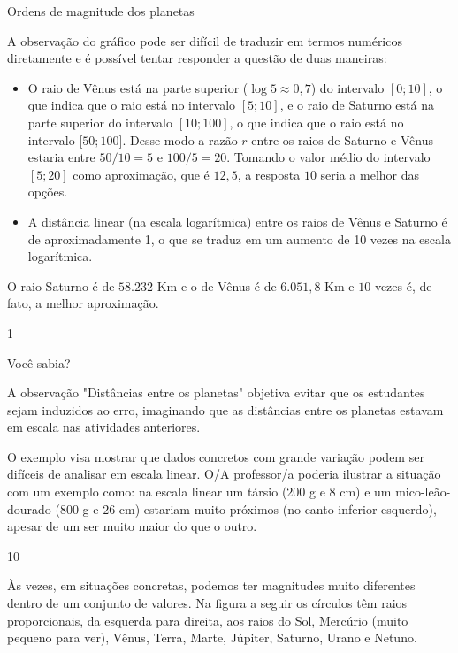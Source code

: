 \begin{answer}{Ordens de magnitude dos planetas}
{
	A observação do gráfico pode ser difícil de traduzir em termos numéricos diretamente e é possível tentar responder a questão de duas maneiras:
	\begin{itemize}
	\item O raio de Vênus está na parte superior ($\log 5 \approx 0{,}7$) do intervalo $[0; 10]$, o que indica que o raio está no intervalo $[5; 10]$, e o raio de Saturno está na parte superior do intervalo $[10; 100]$, o que indica que o raio está no intervalo [$50; 100]$. Desse modo a razão $r$ entre os raios de Saturno e Vênus estaria entre $50/10=5$ e $100/5=20$. Tomando o valor médio do intervalo $[5; 20]$ como aproximação, que é $12{,}5$, a resposta $10$ seria a melhor das opções.
	\item A distância linear (na escala logarítmica) entre os raios de Vênus e Saturno é de aproximadamente 1, o que se traduz em um aumento de 10 vezes na escala logarítmica.
	\end{itemize}
	O raio Saturno é de $58.232$ Km e o de Vênus é de $6.051{,}8$ Km e $10$ vezes é, de fato, a melhor aproximação.
}{1}
\end{answer}

\begin{sugestions}{Você sabia?}
{
	A observação "Distâncias entre os planetas"{} objetiva evitar que os estudantes sejam induzidos ao erro, imaginando que as distâncias entre os planetas estavam em escala nas atividades anteriores.

	O exemplo visa mostrar que dados concretos com grande variação podem ser difíceis de analisar em escala linear. O/A professor/a poderia ilustrar a situação com um exemplo como: na escala linear um társio ($200$ g e $8$ cm) e um mico-leão-dourado ($800$ g e $26$ cm) estariam muito próximos (no canto inferior esquerdo), apesar de um ser muito maior do que o outro.	
}{1}{0}
\end{sugestions}
 \label{SistemaSolar}


Às vezes, em situações concretas, podemos ter magnitudes muito diferentes dentro de um conjunto de valores. Na figura a seguir os círculos têm raios proporcionais, da esquerda para direita, aos raios do Sol, Mercúrio (muito pequeno para ver), Vênus, Terra, Marte, Júpiter, Saturno, Urano e Netuno.


